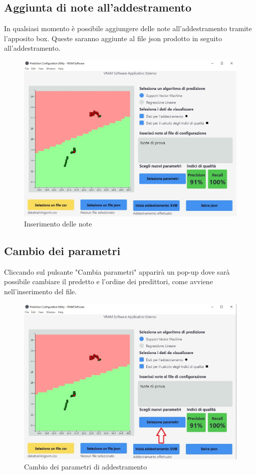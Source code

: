 	\subsection{Aggiunta di note all'addestramento}
	In qualsiasi momento è possibile aggiungere delle note all'addestramento tramite l'apposito box. Queste saranno aggiunte al file json prodotto in seguito all'addestramento.
	\begin{figure}[H] 	
		\begin{center}
			\includegraphics[width=\linewidth]{img/7.jpg}
		\end{center}
		\caption{Inserimento delle note}	
	\end{figure}
		
	\subsection{Cambio dei parametri}
	Cliccando sul pulsante "Cambia parametri" apparirà un pop-up dove sarà possibile cambiare il predetto e l'ordine dei predittori, come avviene nell'inserimento del file.
	\begin{figure}[H] 	
		\begin{center}
			\includegraphics[width=\linewidth]{img/9.jpg}
		\end{center}
		\caption{Cambio dei parametri di addestramento}	
	\end{figure}
